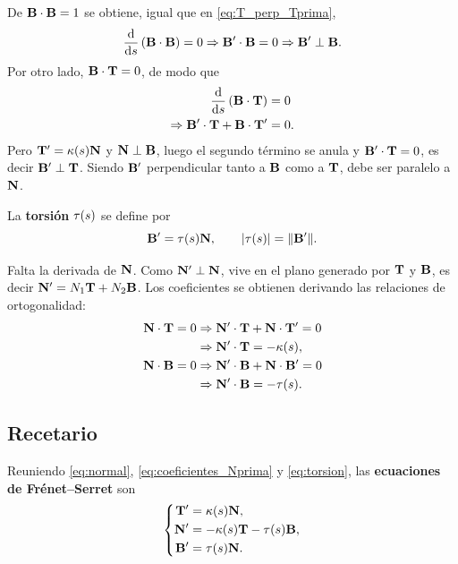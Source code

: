 De $\mathbf{B}\cdot\mathbf{B}=1$ se obtiene, igual que en \eqref{eq:T_perp_Tprima},
\begin{equation}
  \label{eq:B_perp_Bprima}
  \frac{\mathrm{d}}{\mathrm{d}s}\left( \mathbf{B}\cdot\mathbf{B} \right)=0
  \Rightarrow \mathbf{B}'\cdot\mathbf{B}=0
  \Rightarrow \mathbf{B}'\perp\mathbf{B}.
\end{equation}
Por otro lado, $\mathbf{B}\cdot\mathbf{T}=0$, de modo que
\begin{equation}
  \label{eq:B_perp_T}
  \begin{aligned}
    \frac{\mathrm{d}}{\mathrm{d}s}\left( \mathbf{B}\cdot\mathbf{T} \right)&=0\\
    \Rightarrow \mathbf{B}'\cdot\mathbf{T}+\mathbf{B}\cdot\mathbf{T}'&=0 .
  \end{aligned}
\end{equation}
Pero $\mathbf{T}'=\kappa(s)\mathbf{N}$ y $\mathbf{N}\perp\mathbf{B}$, luego el segundo t\'ermino
se anula y $\mathbf{B}'\cdot\mathbf{T}=0$, es decir $\mathbf{B}'\perp\mathbf{T}$. Siendo
$\mathbf{B}'$ perpendicular tanto a $\mathbf{B}$ como a $\mathbf{T}$, debe ser paralelo a
$\mathbf{N}$.

\begin{definicion}[Torsi\'on]
  \label{def:torsion}
  La \textbf{torsi\'on} $\tau(s)$ se define por
  \begin{equation}
    \label{eq:torsion}
    \mathbf{B}'=\tau(s)\mathbf{N},
    \qquad
    \lvert \tau(s) \rvert=\lVert \mathbf{B}' \rVert .
  \end{equation}
\end{definicion}

Falta la derivada de $\mathbf{N}$. Como $\mathbf{N}'\perp\mathbf{N}$, vive en el plano
generado por $\mathbf{T}$ y $\mathbf{B}$, es decir
$\mathbf{N}'=N_1\mathbf{T}+N_2\mathbf{B}$. Los coeficientes se obtienen derivando las
relaciones de ortogonalidad:
\begin{equation}
  \label{eq:coeficientes_Nprima}
  \begin{aligned}
    \mathbf{N}\cdot\mathbf{T}=0
      &\Rightarrow \mathbf{N}'\cdot\mathbf{T}+\mathbf{N}\cdot\mathbf{T}'=0\\
      &\Rightarrow \mathbf{N}'\cdot\mathbf{T}=-\kappa(s),\\
    \mathbf{N}\cdot\mathbf{B}=0
      &\Rightarrow \mathbf{N}'\cdot\mathbf{B}+\mathbf{N}\cdot\mathbf{B}'=0\\
      &\Rightarrow \mathbf{N}'\cdot\mathbf{B}=-\tau(s).
  \end{aligned}
\end{equation}

\subsection{Recetario}
\label{subsec:recetario_frenet}

Reuniendo \eqref{eq:normal}, \eqref{eq:coeficientes_Nprima} y
\eqref{eq:torsion}, las \textbf{ecuaciones de Fr\'enet--Serret} son
\begin{equation}
  \label{eq:frenet_serret}
  \left\{
  \begin{aligned}
    \mathbf{T}'&=\kappa(s)\mathbf{N},\\
    \mathbf{N}'&=-\kappa(s)\mathbf{T}-\tau(s)\mathbf{B},\\
    \mathbf{B}'&=\tau(s)\mathbf{N}.
  \end{aligned}
  \right.
\end{equation}


